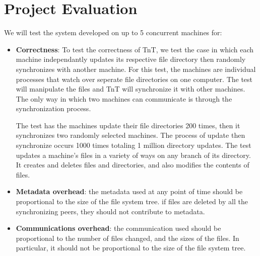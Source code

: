 \section{Project Evaluation}

We will test the system developed on up to 5 concurrent machines for:

\begin{itemize}\renewcommand{\labelitemi}{$\diamond$}
\item {\bf Correctness}: To test the correctness of TnT, we test the case in which each machine independantly updates its respective file directory then randomly synchronizes with another machine.  For this test, the machines are individual processes that watch over seperate file directories on one computer.  The test will manipulate the files and TnT will synchronize it with other machines.  The only way in which two machines can communicate is through the synchronization process.

The test has the machines update their file directories 200 times, then it synchronizes two randomly selected machines.  The process of update then synchronize occurs 1000 times totaling 1 million directory updates.  The test updates a machine's files in a variety of ways on any branch of its directory.  It creates and deletes files and directories, and also modifies the contents of files.  


\item {\bf Metadata overhead}: the metadata used at any point of time should be proportional to the size of the file system tree. if files are deleted by all the synchronizing peers, they should not contribute to metadata.

\item {\bf Communications overhead}: the communication used should be proportional to the number of files changed, and the sizes of the files. In particular, it should not be proportional to the size of the file system tree.
\end{itemize}
